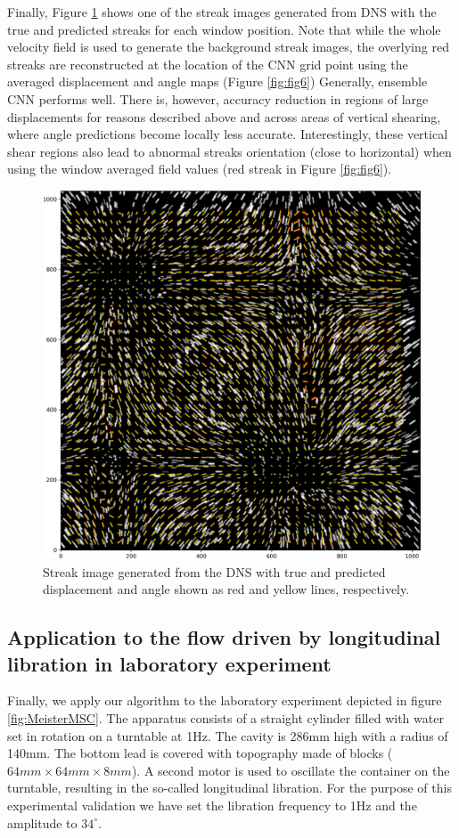 \documentclass{svjour3}                     %
\begin{document}
Finally, Figure \ref{fig:fig8} shows one of the streak images generated from DNS with the true and predicted streaks for each window position. Note that while the whole velocity field is used to generate the background streak images, the overlying red streaks are reconstructed at the location of the CNN grid point using the averaged displacement and angle maps (Figure \ref{fig:fig6}) Generally, ensemble CNN performs well. There is, however, accuracy reduction in regions of large displacements for reasons described above and across areas of vertical shearing, where angle predictions become locally less accurate. Interestingly, these vertical shear regions also lead to abnormal streaks orientation (close to horizontal) when using the window averaged field values (red streak in Figure \ref{fig:fig6}).

\begin{figure}
\includegraphics[width=\textwidth]{figs/figure7.png}
\caption{Streak image generated from the DNS with true and predicted displacement and angle shown as red and yellow lines, respectively.}
\label{fig:fig8}
\end{figure}

\subsection{Application to the flow driven by longitudinal libration in laboratory experiment}\label{experiment}
Finally, we apply our algorithm to the laboratory experiment depicted in figure \ref{fig:MeisterMSC}. The apparatus consists of a straight cylinder filled with water set in rotation on a turntable at 1Hz. The cavity is 286mm high with a radius of 140mm. The bottom lead is covered with topography made of blocks ($64mm\times64mm\times 8mm$). A second motor is used to oscillate the container on the turntable, resulting in the so-called longitudinal libration. For the purpose of this experimental validation we have set the libration frequency to 1Hz and the amplitude to $34^{\circ}$. 
\end{document}
